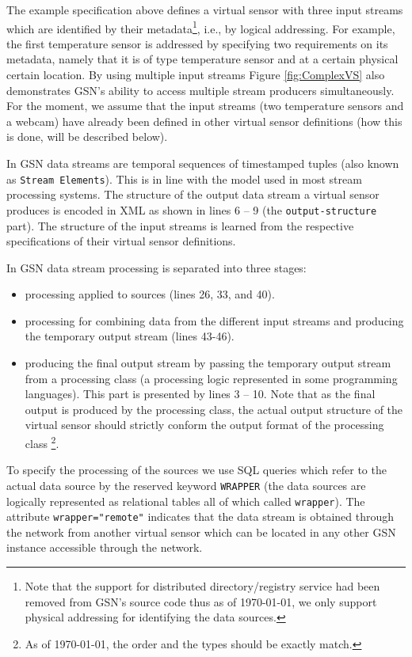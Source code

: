 The example specification above defines a virtual sensor with three input streams
which are identified by their metadata\footnote{Note that the support for distributed directory/registry service had been removed
from GSN's source code thus as of \today, we only support physical addressing for identifying the data sources.},
i.e., by logical addressing. For example, the first temperature sensor is
addressed by specifying two requirements on its metadata, namely
that it is of type temperature sensor and at a certain physical certain
location. By using multiple input streams Figure \ref{fig:ComplexVS} also
demonstrates GSN's ability to access multiple stream producers simultaneously.
For the moment, we assume that the input streams (two temperature sensors and a
webcam) have already been defined in other virtual sensor definitions (how this
is done, will be described below).

In GSN data streams are temporal sequences of timestamped tuples (also known as \texttt{Stream Elements}).
This is in line with the model used in most stream processing systems. The structure of
the output data stream a virtual sensor produces is encoded in XML as shown in lines 6 -- 9 (the \texttt{output-structure} part).
The structure of the input streams is learned from the respective specifications of their virtual sensor definitions. 

In GSN data stream processing is separated into three stages:
\begin{itemize}
\item processing applied to sources (lines 26, 33, and 40).
\item processing for combining data from the different input streams and producing the temporary output stream (lines 43-46).
\item producing the final output stream by passing the temporary output stream from a processing class (a processing logic represented in some programming languages). This part is presented by lines 3 -- 10. Note that as the final output is produced by the processing class, the actual output structure of the virtual sensor should strictly
conform the output format of the processing class \footnote{As of \today, the order and the types should be exactly match.}.
\end{itemize}

To specify the processing of the sources we use SQL queries which refer to the actual data source
by the reserved keyword \verb|WRAPPER| (the data sources are logically represented as relational tables all of which called \verb|wrapper|).
The attribute \verb|wrapper="remote"| indicates that the data stream is obtained through the
network from another virtual sensor which can be located in any other GSN instance accessible through the network.



